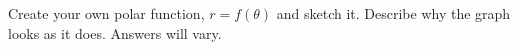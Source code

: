 {Create your own polar function, $r=f(\theta)$ and sketch it. Describe why the graph looks as it does.}
{Answers will vary.
}
